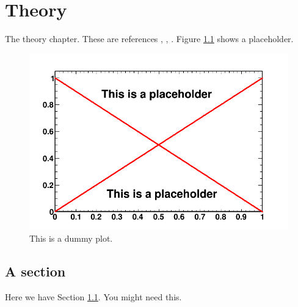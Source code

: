 \chapter{Theory}
\label{ch:theory}
The theory chapter. These are references \cite{aPaper}, \cite{aThesis}, \cite{aWiki}. Figure \ref{fig:dummy} shows a placeholder. 

\begin{figure}
  \centering
  \includegraphics[width=.9\linewidth]{pic/dummy.png}
  \caption{This is a dummy plot.}
  \label{fig:dummy}
\end{figure}

\section{A section}
\label{sec:section}
Here we have Section \ref{sec:section}.  You might need this.
